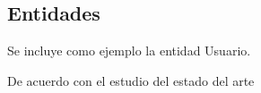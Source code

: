 \subsection{\forlnameref Entidades}
\label{sec:entities}

\begin{shaded}
Se incluye como ejemplo la entidad Usuario.
\end{shaded}

\def \irqName {Usuario}
\def \irqDescription {Usuario básico de la aplicación.}De acuerdo con el estudio del estado del arte
\def \irqNumAttrs {5} %
\def \irqAttrs { 
    & Nombre        & \code{texto(64)}  &            & \checkmark   \\ \cline{2-5}
    & Apellidos     & \code{texto(128)} &            & \checkmark   \\ \cline{2-5}
    & Usuario       & \code{texto(16)}  & \checkmark & \checkmark   \\ \cline{2-5}
    & Contraseña    & \code{texto(16)}  &            & \checkmark   \\ \cline{2-5}
    \irqTitle & Contactos  & \code{lista<Contacto>}  &     & \checkmark     \\ \hline
}
